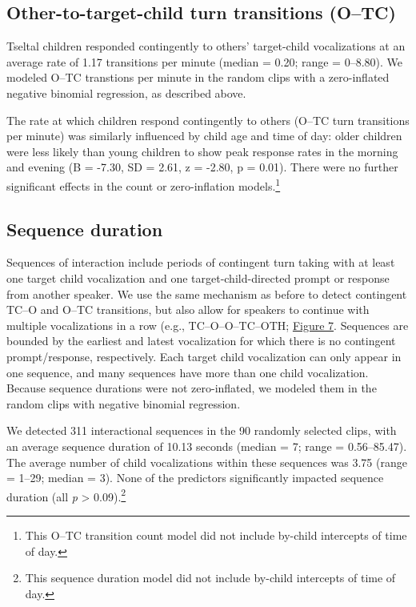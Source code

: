 \documentclass[floatsintext,man]{apa6}
\theoremstyle{definition}
\theoremstyle{definition}
\theoremstyle{definition}
\theoremstyle{remark}
\begin{document}
\subsection{Other-to-target-child turn transitions
(O--TC)}\label{other-to-target-child-turn-transitions-otc}

Tseltal children responded contingently to others' target-child
vocalizations at an average rate of 1.17 transitions per minute (median
= 0.20; range = 0--8.80). We modeled O--TC transtions per minute in the
random clips with a zero-inflated negative binomial regression, as
described above.

The rate at which children respond contingently to others (O--TC turn
transitions per minute) was similarly influenced by child age and time
of day: older children were less likely than young children to show peak
response rates in the morning and evening (B = -7.30, SD = 2.61, z =
-2.80, p = 0.01). There were no further significant effects in the count
or zero-inflation models.\footnote{This O--TC transition count model did
  not include by-child intercepts of time of day.}

\subsection{Sequence duration}\label{sequence-duration}

Sequences of interaction include periods of contingent turn taking with
at least one target child vocalization and one target-child-directed
prompt or response from another speaker. We use the same mechanism as
before to detect contingent TC--O and O--TC transitions, but also allow
for speakers to continue with multiple vocalizations in a row (e.g.,
TC--O--O--TC--OTH; \protect\hyperlink{fig7}{Figure 7}. Sequences are
bounded by the earliest and latest vocalization for which there is no
contingent prompt/response, respectively. Each target child vocalization
can only appear in one sequence, and many sequences have more than one
child vocalization. Because sequence durations were not zero-inflated,
we modeled them in the random clips with negative binomial regression.

We detected 311 interactional sequences in the 90 randomly selected
clips, with an average sequence duration of 10.13 seconds (median = 7;
range = 0.56--85.47). The average number of child vocalizations within
these sequences was 3.75 (range = 1--29; median = 3). None of the
predictors significantly impacted sequence duration (all \emph{p}
\textgreater{} 0.09).\footnote{This sequence duration model did not
  include by-child intercepts of time of day.}
\end{document}
